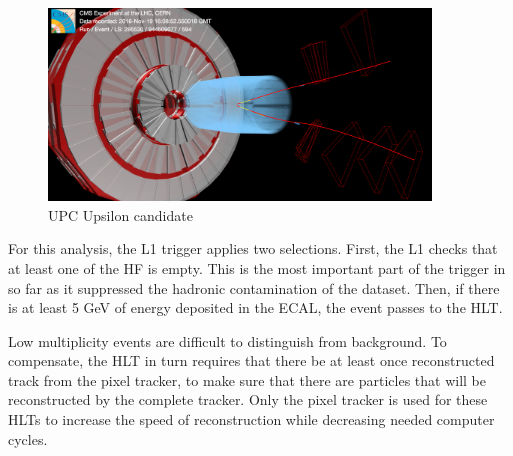 \begin{figure}[h!]
\begin{centering}
\includegraphics[width=4in]{Chapter3/importfigs/upcJpsi_run285530_lumi594_event944509077_v0.png}
\par\end{centering}
\caption{UPC Upsilon candidate \label{fig:eventdisplayUPCUps}}
\end{figure}

For this analysis, the L1 trigger applies two selections. First, the L1 checks that at least one of the HF is empty. This is the most important part of the trigger in so far as it suppressed the hadronic contamination of the dataset. Then, if there is at least 5 GeV of energy deposited in the ECAL, the event passes to the HLT. 

Low multiplicity events are difficult to distinguish from background. To compensate, the HLT in turn requires that there be at least once reconstructed track from the pixel tracker, to make sure that there are particles that will be reconstructed by the complete tracker. Only the pixel tracker is used for these HLTs to increase the speed of reconstruction while decreasing needed computer cycles. 